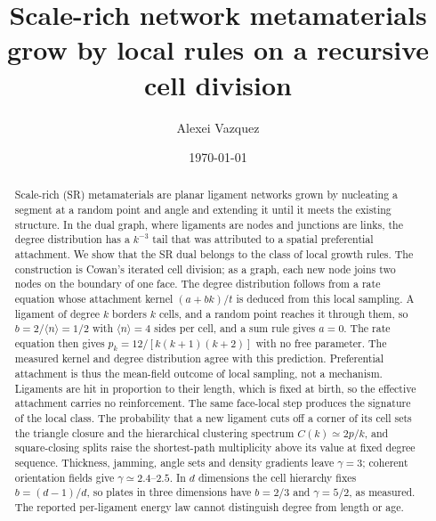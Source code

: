 \documentclass[pre,twocolumn,superscriptaddress,amsmath,amssymb,floatfix]{revtex4-2}
\begin{document}
\title{Scale-rich network metamaterials grow by local rules on a recursive cell division}

\author{Alexei Vazquez}

\date{\today}

\begin{abstract}
Scale-rich (SR) metamaterials are planar ligament networks grown by nucleating a
segment at a random point and angle and extending it until it meets the existing
structure. In the dual graph, where ligaments are nodes and junctions are links, the
degree distribution has a $k^{-3}$ tail that was attributed to a spatial preferential
attachment. We show that the SR dual belongs to the class of local growth rules.
The construction is Cowan's iterated cell division; as a graph, each new node joins two
nodes on the boundary of one face. The degree distribution follows from a rate equation whose attachment kernel
$(a+bk)/t$ is deduced from this local sampling. A ligament of degree $k$ borders $k$
cells, and a random point reaches it through them, so $b=2/\langle n\rangle=1/2$ with
$\langle n\rangle=4$ sides per cell, and a sum rule gives $a=0$. The rate equation then
gives $p_k=12/[k(k+1)(k+2)]$ with no free parameter. The measured kernel and degree
distribution agree with this prediction. Preferential attachment is thus the mean-field outcome of
local sampling, not a mechanism. Ligaments are hit in proportion to their length,
which is fixed at birth, so the effective attachment carries no reinforcement. The same face-local step produces the signature of the local class.
The probability that a new ligament cuts off a corner of its cell sets the triangle
closure and the hierarchical clustering spectrum
$C(k)\simeq2p/k$, and square-closing splits raise the shortest-path multiplicity above
its value at fixed degree sequence. Thickness, jamming, angle sets and density gradients
leave $\gamma=3$; coherent orientation fields give $\gamma\simeq2.4$--$2.5$. In $d$
dimensions the cell hierarchy fixes $b=(d-1)/d$, so plates in three dimensions have
$b=2/3$ and $\gamma=5/2$, as measured. The
reported per-ligament energy law cannot distinguish degree from length or age.
\end{abstract}

\maketitle
\end{document}
